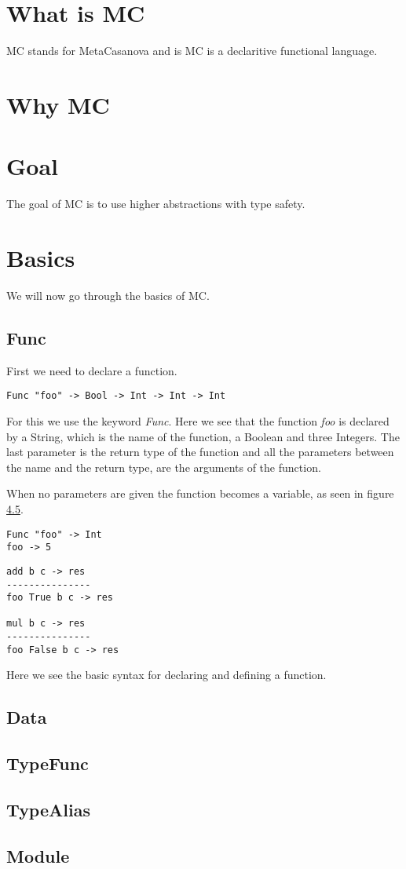 \section{What is MC}
MC stands for MetaCasanova and is MC is a declaritive functional language.
\section{Why MC}


\section{Goal}
The goal of MC is to use higher abstractions with type safety.

\section{Basics}
We will now go through the basics of MC.

\subsection{Func}
First we need to declare a function.
   \begin{lstlisting}
Func "foo" -> Bool -> Int -> Int -> Int
   \end{lstlisting}
   For this we use the keyword \emph{Func}.
   Here we see that the function \emph{foo} is declared by a String, which is the name of the function, a Boolean and three Integers.
   The last parameter is the return type of the function and all the parameters between the name and the return type, are the arguments of the function.

   When no parameters are given the function becomes a variable, as seen in figure \ref{}.
   \begin{lstlisting}
Func "foo" -> Int
foo -> 5
   \end{lstlisting}

   \begin{lstlisting}
add b c -> res
---------------
foo True b c -> res

mul b c -> res
---------------
foo False b c -> res
   \end{lstlisting}

   Here we see the basic syntax for declaring and defining a function.

\subsection{Data}
\subsection{TypeFunc}
\subsection{TypeAlias}
\subsection{Module}
